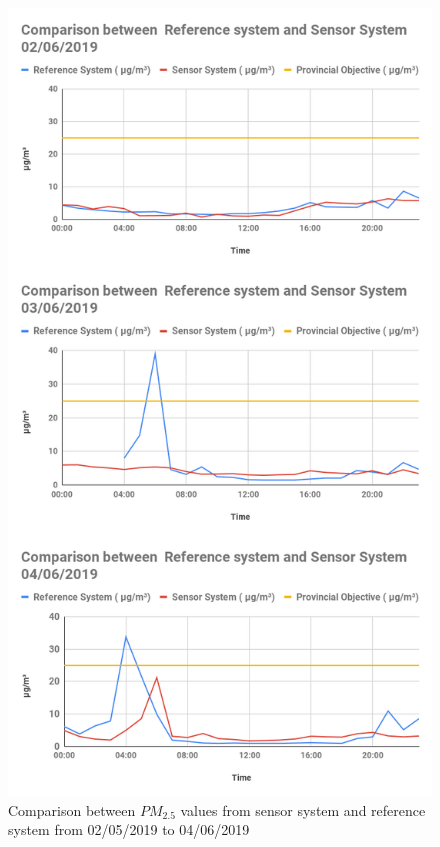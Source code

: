 \begin{figure}[h]
  \begin{center}
  \includegraphics[scale=0.43]{images/figure101.png}
  \end{center}
  \caption{Comparison between $PM_{2.5}$ values from sensor system and reference system from 02/05/2019 to 04/06/2019}
\label{PM2.5.1}
\hspace{1 cm}
\end{figure}

